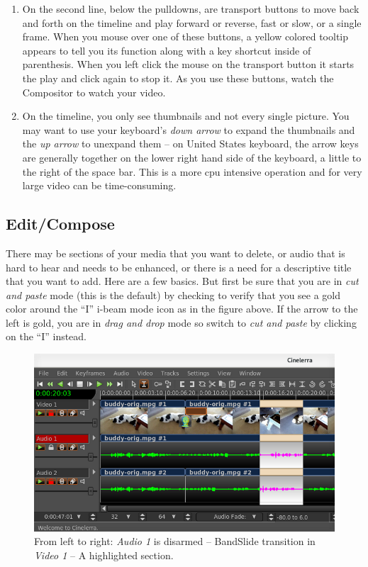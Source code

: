 \begin{enumerate}
	\item On the second line, below the pulldowns, are transport buttons to move back and forth on the
	timeline and play forward or reverse, fast or slow, or a single frame.  When you mouse over one of
	these buttons, a yellow colored tooltip appears to tell you its function along with a key shortcut
	inside of parenthesis.  When you left click the mouse on the transport button it starts the play and 
	click again to stop it.  As you use these buttons, watch the Compositor to watch your video.
	\item On the timeline, you only see thumbnails and not every single picture.  You may want to
	use your keyboard’s \textit{down arrow} to expand the thumbnails and the \textit{up arrow} to unexpand them -- on
	United States keyboard, the arrow keys are generally together on the lower right hand side of the
	keyboard, a little to the right of the space bar.  This is a more cpu intensive operation and for very
	large video can be time-consuming.
\end{enumerate}

\subsection{Edit/Compose}%
\label{sub:edit_compose}

There may be sections of your media that you want to delete, or audio that is hard to hear and needs to be enhanced, or there is a need for a descriptive title that you want to add.  Here are a few basics.  But first be sure that you are in \textit{cut and paste} mode (this is the default) by checking to verify that you see a gold color around the “I” i-beam mode icon as in the figure above.  If the arrow to the left is gold, you are in \textit{drag and drop} mode so switch to \textit{cut and paste} by clicking on the “I” instead.

\begin{figure}[htpb]
	\centering
	\includegraphics[width=1.0\linewidth]{images/some_editing.png}
	\caption{From left to right:\textit{ Audio 1} is disarmed --  BandSlide transition in \textit{Video 1} -- A highlighted section.}	
\end{figure}

